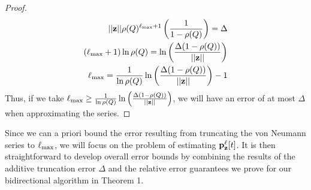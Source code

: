 {\begin{proof}
\begin{align*}
||\mathbf{z}|| \rho(Q)^{\ell_{\max}+1}\left(\frac{1}{1 - \rho(Q)} \right) =  \Delta \\
(\ell_{\max} + 1)\ln \rho(Q) = \ln \left(\frac{\Delta(1 - \rho(Q)) }{||\mathbf{z}||}\right) \\
\ell_{\max} = \frac{1}{\ln \rho(Q)}  \ln \left(\frac{\Delta(1 - \rho(Q)) }{||\mathbf{z}||}\right) - 1
\end{align*}
Thus, if we take $\ell_{\max} \geq \frac{1}{\ln \rho(Q)}  \ln \left(\frac{\Delta(1 - \rho(Q)) }{||\mathbf{z}||}\right)$, we will have an error of at most $\Delta$ when approximating the series.
\end{proof}
Since we can a priori bound the error resulting from truncating the von Neumann series to $\ell_{\max}$, we will focus on the problem of estimating ${\mathbf{p}}_\mathbf{z}^{\ell}[t]$. It is then straightforward to develop overall error bounds by combining the results of the additive truncation error $\Delta$ and the relative error guarantees we prove for our bidirectional algorithm in Theorem 1. 
}
